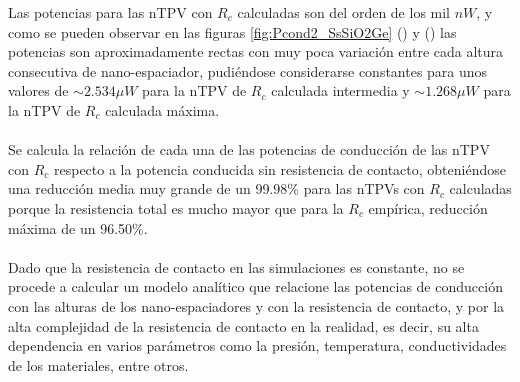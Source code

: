 Las potencias para las nTPV con $R_c$ calculadas son del orden de los mil $n W$, y como se pueden observar en las figuras \ref{fig:Pcond2_SsSiO2Ge} () y () las potencias son aproximadamente rectas con muy poca variación entre cada altura consecutiva de nano-espaciador, pudiéndose considerarse constantes para unos valores de $\sim 2.534 \mu W$ para la nTPV de $R_c$ calculada intermedia y $\sim 1.268 \mu W$ para la nTPV de $R_c$ calculada máxima.\\\\
Se calcula la relación de cada una de las potencias de conducción de las nTPV con $R_c$ respecto a la potencia conducida sin resistencia de contacto, obteniéndose una reducción media muy grande de un 99.98\% para las nTPVs con $R_c$ calculadas porque la resistencia total es mucho mayor que para la $R_c$ empírica, reducción máxima de un 96.50\%.\\\\
Dado que la resistencia de contacto en las simulaciones es constante, no se procede a calcular un modelo analítico que relacione las potencias de conducción con las alturas de los nano-espaciadores y con la resistencia de contacto, y por la alta complejidad de la resistencia de contacto en la realidad, es decir, su alta dependencia en varios parámetros como la presión, temperatura, conductividades de los materiales, entre otros.
